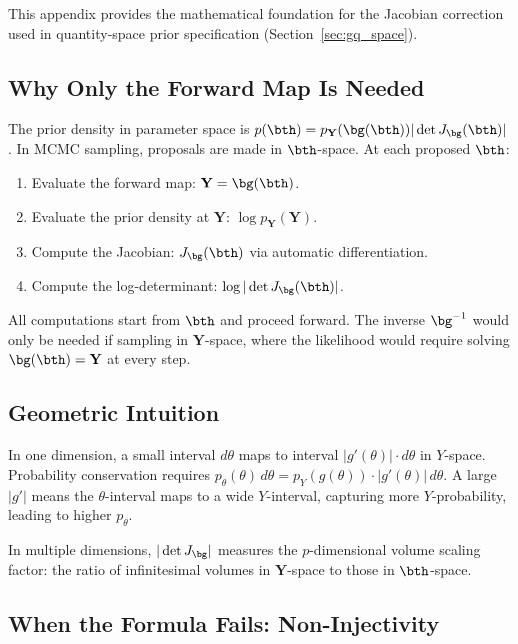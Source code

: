 \label{app:jacobian_details}

This appendix provides the mathematical foundation for the Jacobian correction
used in quantity-space prior specification
(Section~\ref{sec:gq_space}).

\subsection{Why Only the Forward Map Is Needed}

The prior density in parameter space is
$p(\bth) = p_{\mathbf{Y}}(\bg(\bth))
|\det J_{\bg}(\bth)|$.
In MCMC sampling, proposals are made in $\bth$-space. At each
proposed $\bth$:
\begin{enumerate}
  \item Evaluate the forward map: $\mathbf{Y} = \bg(\bth)$.
  \item Evaluate the prior density at $\mathbf{Y}$:
    $\log p_{\mathbf{Y}}(\mathbf{Y})$.
  \item Compute the Jacobian: $J_{\bg}(\bth)$ via
    automatic differentiation.
  \item Compute the log-determinant:
    $\log|\det J_{\bg}(\bth)|$.
\end{enumerate}
All computations start from $\bth$ and proceed forward.
The inverse $\bg^{-1}$ would only be needed if sampling in
$\mathbf{Y}$-space, where the likelihood would require solving
$\bg(\bth) = \mathbf{Y}$ at every step.

\subsection{Geometric Intuition}

In one dimension, a small interval $d\theta$ maps to interval
$|g'(\theta)| \cdot d\theta$ in $Y$-space. Probability conservation requires
$p_\theta(\theta) \, d\theta = p_Y(g(\theta)) \cdot |g'(\theta)| \, d\theta$.
A large $|g'|$ means the $\theta$-interval maps to a wide $Y$-interval,
capturing more $Y$-probability, leading to higher $p_\theta$.

In multiple dimensions, $|\det J_{\bg}|$ measures the $p$-dimensional
volume scaling factor: the ratio of infinitesimal volumes in $\mathbf{Y}$-space
to those in $\bth$-space.

\subsection{When the Formula Fails: Non-Injectivity}

